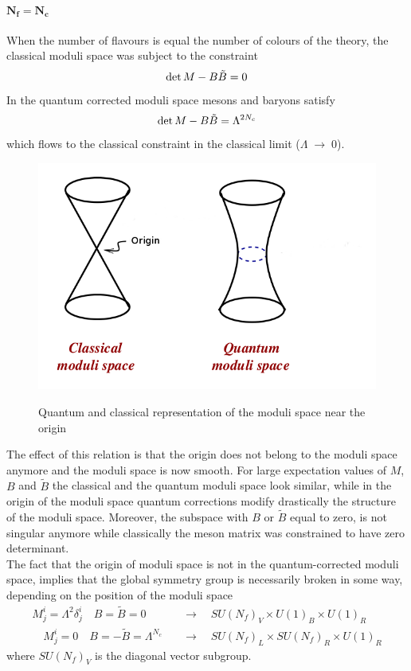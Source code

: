 \paragraph{$\mathbf{ N_f = N_c}$}
When the number of flavours is equal the number of colours of the theory, the classical moduli space was subject to the constraint
\begin{equation}
 \mathrm{det } \,{M} - B \tilde{B} = 0
\end{equation}
In the quantum corrected moduli space mesons and baryons satisfy \cite{Seiberg:1994bz}
\begin{equation}
 \mathrm{det } \,{M} - B \tilde{B} = \Lambda^{2 N_c}
\end{equation}
which flows to the classical constraint in the classical limit ($\Lambda \; \rightarrow \;0$).
\\
\begin{figure}
\centering
{\includegraphics[width=5 cm]{quantum_moduli_space_sqcd.png} }
{\caption{ Quantum and classical representation of the moduli space near the origin}}
\end{figure}
The effect of this relation is that the origin  does not belong to the moduli space anymore and the moduli space is now smooth.
For large expectation values of $M$, $B$ and $\tilde{B}$ the classical and the quantum moduli space look similar, while in the origin of the moduli space quantum corrections modify drastically the structure of the moduli space.
Moreover, the subspace with $B$ or $\tilde{B}$ equal to zero, is not singular anymore while classically the meson matrix was constrained to have zero determinant. 
\\
The fact that the origin of moduli space is not in the quantum-corrected moduli space, implies that the global symmetry group is necessarily broken in some way, depending on the position of the moduli space 
\begin{align}
M^i_j = \Lambda^2 \delta^i_j \quad B=\tilde{B}= 0 \quad & \rightarrow  \quad SU(N_f)_V \times U(1)_B \times U(1)_R\\
\quad M^i_j = 0 \quad B=-\tilde{B}= \Lambda^{N_c} \quad & \rightarrow  \quad SU(N_f)_L \times SU(N_f)_R \times U(1)_R
\end{align}
where $SU(N_f)_V$ is the diagonal vector subgroup.
\\
